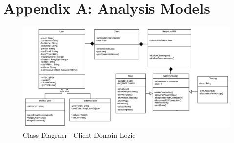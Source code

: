 \documentclass{scrreprt}
\begin{document}
\chapter{Appendix A: Analysis Models}



    
\clearpage


\begin{figure}[ht!]
    \centering
    \includegraphics[angle=90, height=.92\textheight]{img3/ClassDiagram1.pdf}
    \caption{Class Diagram - Client Domain Logic}
    \label{fig:classdig1}
\end{figure}
\end{document}
